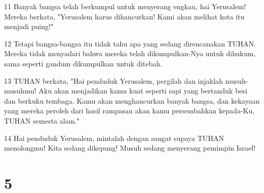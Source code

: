 \par 11 Banyak bangsa telah berkumpul untuk menyerang engkau, hai Yerusalem! Mereka berkata, "Yerusalem harus dihancurkan! Kami akan melihat kota itu menjadi puing!"
\par 12 Tetapi bangsa-bangsa itu tidak tahu apa yang sedang direncanakan TUHAN. Mereka tidak menyadari bahwa mereka telah dikumpulkan-Nya untuk dihukum, sama seperti gandum dikumpulkan untuk ditebah.
\par 13 TUHAN berkata, "Hai penduduk Yerusalem, pergilah dan injaklah musuh-musuhmu! Aku akan menjadikan kamu kuat seperti sapi yang bertanduk besi dan berkuku tembaga. Kamu akan menghancurkan banyak bangsa, dan kekayaan yang mereka peroleh dari hasil rampasan akan kamu persembahkan kepada-Ku, TUHAN semesta alam."
\par 14 Hai penduduk Yerusalem, mintalah dengan sangat supaya TUHAN menolongmu! Kita sedang dikepung! Musuh sedang menyerang pemimpin Israel!

\chapter{5}

